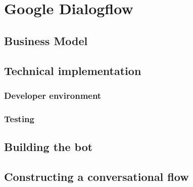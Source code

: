 \chapter{Google Dialogflow}

\section{Business Model}

\section{Technical implementation}

\subsection{Developer environment}

\subsection{Testing}

\section{Building the bot}

\section{Constructing a conversational flow}